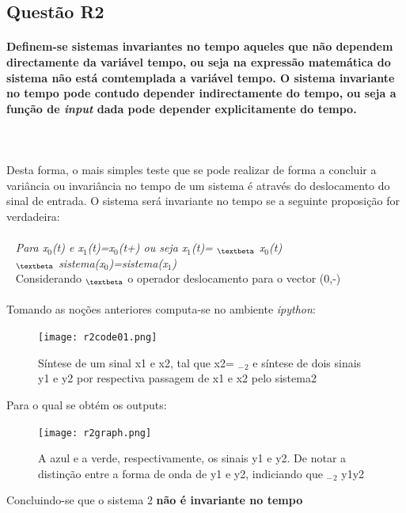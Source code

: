 \documentclass[a4paper,12pt]{article}
\begin{document}
		\subsection{Questão R2}
			\paragraph{Definem-se sistemas invariantes no tempo aqueles que não dependem directamente da variável tempo, ou seja na expressão matemática do sistema não está comtemplada a variável tempo. O sistema invariante no tempo pode contudo depender indirectamente do tempo, ou seja a função de \textit{input} dada pode depender explicitamente do tempo.}
			\mbox{}\\
			\mbox{}\\
			Desta forma, o mais simples teste que se pode realizar de forma a concluir a variância ou invariância no tempo de um sistema é através do deslocamento do sinal de entrada.
			O sistema será invariante no tempo se a seguinte proposição for verdadeira:
			\mbox{}\\
			\mbox{} \\
			\mbox{		} \textit{Para x$_0$(t) e x$_1$(t)=x$_0$(t+\textbeta) ou seja x$_1$(t)= $_\textbeta$ x$_0$(t)
			\\ 
			\mbox{          } $_\textbeta$ sistema(x$_0$)=sistema(x$_1$)}
			\mbox{}\\
			\mbox{          } Considerando $_\textbeta$ o operador deslocamento para o vector (0,-\textbeta)
\mbox{}\\\mbox{}\\
			Tomando as noções anteriores computa-se no ambiente \textit{ipython}:
			\begin{figure}[H]
    				\centering
    				\captionsetup{justification=centering}
    				\texttt{[image: r2code01.png]}
				\caption{Síntese de um sinal x1 e  x2, tal que x2= $_-$$_2$ e síntese de dois sinais y1 e y2 por respectiva passagem de x1 e x2 pelo sistema2}
    			\end{figure}
			Para o qual se obtém os outputs:
 			\begin{figure}[H]
      				\centering
      				\captionsetup{justification=centering}
      				\texttt{[image: r2graph.png]}
				\caption{A azul e a verde, respectivamente, os sinais y1 e y2. De notar a distinção entre a forma de onda de y1 e y2, indiciando que  $_-$$_2$ y1\neq y2}
      			\end{figure}
			Concluindo-se que o sistema 2 \textbf{não é invariante no tempo}
	\newpage	
\end{document}
